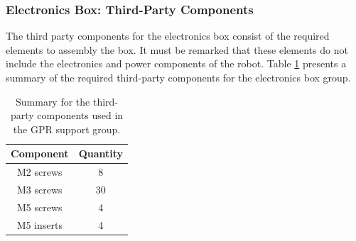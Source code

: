 \documentclass{article}
\begin{document}
\clearpage

\subsubsection{Electronics Box: Third-Party Components}
The third party components for the electronics box consist of the required elements to assembly the box. It must be remarked that these elements do not include the electronics and power components of the robot. Table \ref{tab:eb_third_party} presents a summary of the required third-party components for the electronics box group.

\begin{table}[h]
    \centering
    \begin{tabular}{|c|c|}
        \textbf{Component} & \textbf{Quantity} \\ \hline
        M2 screws & 8 \\
        M3 screws & 30 \\
        M5 screws & 4 \\
        M5 inserts & 4 
    \end{tabular}
    \caption{Summary for the third-party components used in the GPR support group. }
    \label{tab:eb_third_party}
\end{table}
\end{document}
